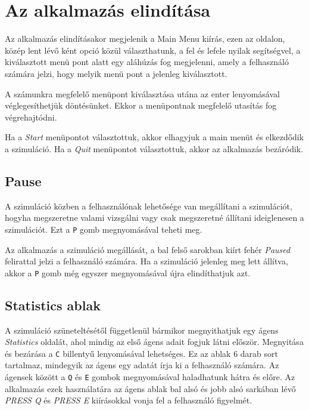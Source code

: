 
\section{Az alkalmazás elindítása}

Az alkalmazás elindításakor megjelenik a Main Menu kiírás, ezen az oldalon, közép lent lévő ként opció közül választhatunk,
a fel és lefele nyilak segítségvel, a kiválasztott menü pont alatt egy aláhúzás fog megjelenni,
amely a felhasználó számára jelzi, hogy melyik menü pont a jelenleg kiválasztott.

A számunkra megfelelő menüpont kiválasztása utána az enter lenyomásával véglegesíthetjük döntésünket.
Ekkor a menüpontnak megfelelő utasítás fog végrehajtódni.

Ha a \textit{Start} menüpontot választottuk, akkor elhagyjuk a main menüt és elkezdődik a szimuláció.
Ha a \textit{Quit} menüpontot választottuk, akkor az alkalmazás bezáródik.


\subsection{Pause}
A szimuláció közben a felhasználónak lehetősége van megállítani a szimulációt, hogyha megszeretne valami vizsgálni vagy csak
megszeretné állítani ideiglenesen a szimulációt. Ezt a \texttt{P} gomb megnyomásával teheti meg.

Az alkalmazás a szimuláció megállását, a bal felső sarokban kiírt fehér \textit{Paused} felirattal jelzi a felhasználó számára.
Ha a szimuláció jelenleg meg lett állítva, akkor a \texttt{P} gomb még egyszer megnyomásával újra elindíthatjuk azt.

\subsection{Statistics ablak}
A szimuláció szüneteltésétől függetlenül bármikor megnyithatjuk egy ágens \textit{Statistics} oldalát, ahol mindig az első ágens adait fogjuk látni először.
Megnyitása és bezárása a \texttt{C} billentyű lenyomásával lehetséges.
Ez az ablak 6 darab sort tartalmaz, mindegyik az ágens egy adatát írja ki a felhasználó számára.
Az ágensek között a \texttt{Q} és \texttt{E} gombok megnyomásával haladhatunk hátra és előre. Az alkalmazás ezek használatára az ágens ablak bal alsó és jobb alsó
sarkában lévő \textit{PRESS Q} és \textit{PRESS E} kiírásokkal vonja fel a felhasználó figyelmét.

